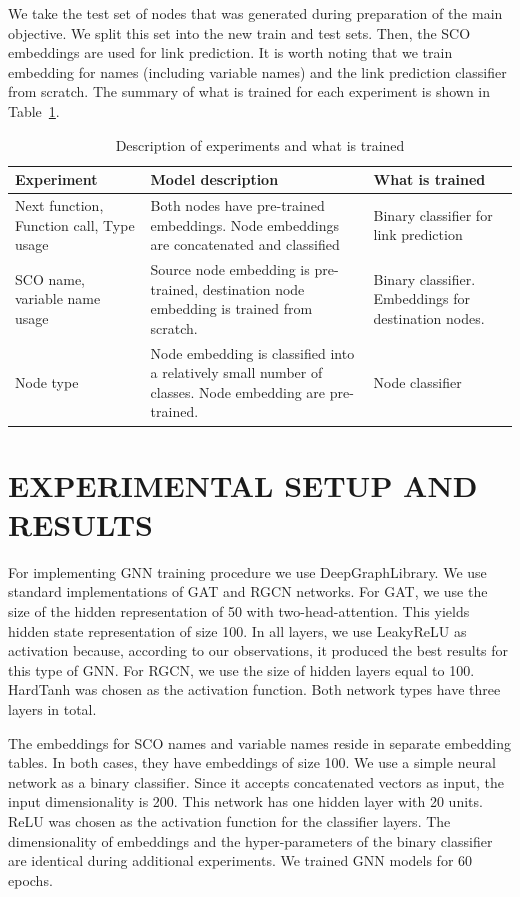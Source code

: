 \documentclass[a4paper,twoside]{article}
\begin{document}
We take the test set of nodes that was generated during preparation of the main objective. We split this set into the new train and test sets. Then, the SCO embeddings are used for link prediction. It is worth noting that we train embedding for names (including variable names) and the link prediction classifier from scratch. The summary of what is trained for each experiment is shown in Table~\ref{tbl:experiment_desc}.

\begin{table}
    \centering
    \caption{Description of experiments and what is trained}\label{tbl:experiment_desc}
    \begin{tabular}{p{3cm}p{6cm}p{6cm}}
    \toprule
        \textbf{Experiment} & \textbf{Model description} & \textbf{What is trained} \\ \midrule
        Next function, Function call, Type usage & Both nodes have pre-trained embeddings. Node embeddings are concatenated and classified & Binary classifier for link prediction \\ \midrule
        SCO name, variable name usage & Source node embedding is pre-trained, destination node embedding is trained from scratch. & Binary classifier. Embeddings for destination nodes. \\ \midrule
        Node type & Node embedding is classified into a relatively small number of classes. Node embedding are pre-trained. & Node classifier \\ \bottomrule
    \end{tabular}
\end{table}



\section{\uppercase{Experimental Setup and Results}}

For implementing GNN training procedure we use DeepGraphLibrary. We use standard implementations of GAT and RGCN networks. For GAT, we use the size of the hidden representation of 50 with two-head-attention. This yields hidden state representation of size 100. In all layers, we use LeakyReLU as activation because, according to our observations, it produced the best results for this type of GNN\@. For RGCN, we use the size of hidden layers equal to 100. HardTanh was chosen as the activation function. Both network types have three layers in total. 

The embeddings for SCO names and variable names reside in separate embedding tables. In both cases, they have embeddings of size 100. We use a simple neural network as a binary classifier. Since it accepts concatenated vectors as input, the input dimensionality is 200. This network has one hidden layer with 20 units. ReLU was chosen as the activation function for the classifier layers. The dimensionality of embeddings and the hyper-parameters of the binary classifier are identical during additional experiments. We trained GNN models for 60 epochs.
\end{document}
